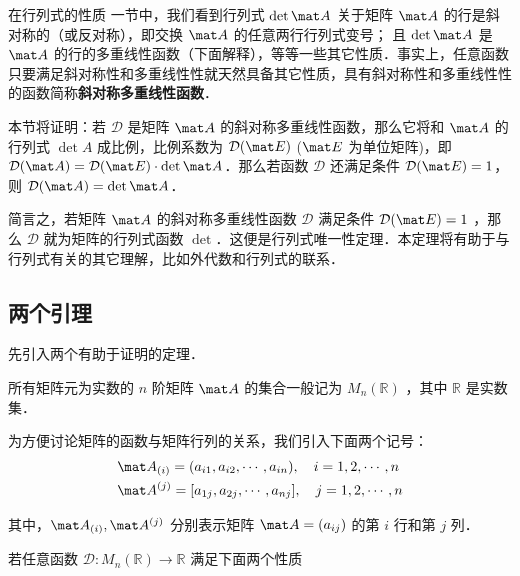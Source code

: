 
在行列式的性质 一节中，我们看到行列式 $\det \mat A$ 关于矩阵 $\mat A$ 的行是斜对称的（或反对称），即交换 $\mat A$ 的任意两行行列式变号； 且 $\det \mat A$ 是 $\mat A$ 的行的多重线性函数（下面解释），等等一些其它性质．事实上，任意函数只要满足斜对称性和多重线性性就天然具备其它性质，具有斜对称性和多重线性性的函数简称\textbf{斜对称多重线性函数}．

本节将证明：若 $\mathcal D$ 是矩阵 $\mat A$ 的斜对称多重线性函数，那么它将和 $\mat A$ 的行列式 $\det A$ 成比例，比例系数为 $\mathcal D(\mat E)$ ($\mat E$ 为单位矩阵)，即 $\mathcal D(\mat A)=\mathcal D(\mat E)\cdot \det \mat A$．那么若函数 $\mathcal D$ 还满足条件 $\mathcal D(\mat E)=1$，则 $\mathcal D(\mat A)=\det\mat A$．

简言之，若矩阵 $\mat A$ 的斜对称多重线性函数 $\mathcal D$ 满足条件 $\mathcal D(\mat E)=1$ ，那么 $\mathcal D$ 就为矩阵的行列式函数 $\det$．这便是行列式唯一性定理．本定理将有助于与行列式有关的其它理解，比如外代数和行列式的联系．

\subsection{两个引理}

先引入两个有助于证明的定理．

所有矩阵元为实数的 $n$ 阶矩阵 $\mat A$ 的集合一般记为 $M_n(\mathbb R)$ ，其中 $\mathbb R$ 是实数集．

为方便讨论矩阵的函数与矩阵行列的关系，我们引入下面两个记号：
\begin{equation}
\begin{aligned}
&\mat A_{(i)}=(a_{i1},a_{i2},\cdots,a_{in}),\quad i=1,2,\cdots, n\\
&\mat A^{(j)}=[a_{1j},a_{2j},\cdots,a_{nj}],\quad j=1,2,\cdots, n
\end{aligned}
\end{equation}

其中，$\mat A_{(i)},\mat A^{(j)}$ 分别表示矩阵 $\mat A=(a_{ij})$ 的第 $i$ 行和第 $j$ 列． 
\begin{lemma}{}
若任意函数 $\mathcal D:M_n(\mathbb R)\rightarrow \mathbb R$ 满足下面两个性质
\end{lemma}
